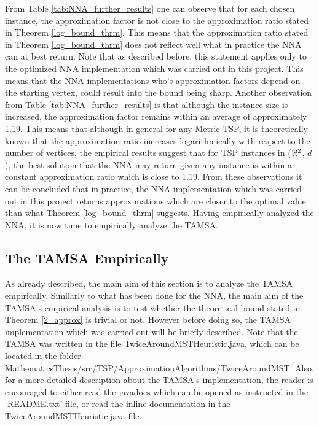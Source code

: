 \documentclass[12pt]{article}
\numberwithin{equation}{subsection}
\numberwithin{table}{subsection}
\numberwithin{algorithm}{subsection}
\numberwithin{figure}{subsection}
\begin{document}
From Table \ref{tab:NNA_further_results} one can observe that for each chosen instance, the approximation factor is not close to the approximation ratio stated in Theorem \ref{log_bound_thrm}. This means that the approximation ratio stated in Theorem \ref{log_bound_thrm} does not reflect well what in practice the NNA can at best return. Note that as described before, this statement applies only to the optimized NNA implementation which was carried out in this project. This means that the NNA implementations who's approximation factors depend on the starting vertex, could result into the bound being sharp. Another observation from Table \ref{tab:NNA_further_results} is that although the instance size is increased, the approximation factor remains within an average of approximately 1.19. This means that although in general for any Metric-TSP, it is theoretically known that the approximation ratio increases logarithmically with respect to the number of vertices, the empirical results suggest that for TSP instances in ($\real^2$, $d$), the best solution that the NNA may return given any instance is within a constant approximation ratio which is close to 1.19. From these observations it can be concluded that in practice, the NNA implementation which was carried out in this project returns approximations which are closer to the optimal value than what Theorem \ref{log_bound_thrm} suggests. Having empirically analyzed the NNA, it is now time to empirically analyze the TAMSA.
\subsection{The TAMSA Empirically}
As already described, the main aim of this section is to analyze the TAMSA empirically. Similarly to what has been done for the  NNA, the main aim of the TAMSA's empirical analysis is to test whether the theoretical bound stated in Theorem \ref{2_approx} is trivial or not. However before doing so, the TAMSA implementation which was carried out will be briefly described. Note that the TAMSA was written in the file TwiceAroundMSTHeuristic.java, which can be located in the folder MathematicsThesis/src/TSP/ApproximationAlgorithms/TwiceAroundMST. Also, for a more detailed description about the TAMSA's implementation, the reader is encouraged to either read the javadocs which can be opened as instructed in the `README.txt' file, or read the inline documentation in the TwiceAroundMSTHeuristic.java file.
\end{document}
